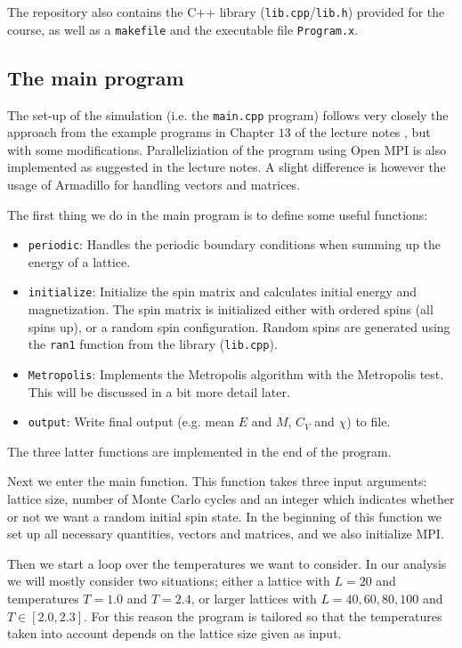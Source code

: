 \documentclass[12pt, a4paper]{article}
\begin{document}
The repository also contains the C++ library (\texttt{lib.cpp}/\texttt{lib.h}) provided for the course, 
as well as a \texttt{makefile} and the executable file \texttt{Program.x}. 

\subsection{The main program}

The set-up of the simulation (i.e. the \texttt{main.cpp} program) follows very closely the approach from 
the example programs in Chapter $13$ of the lecture notes \cite{Lecture Notes}, but with some 
modifications. Paralleliziation of the program using Open MPI is also implemented as suggested in 
the lecture notes. A slight difference is however the usage of Armadillo \cite{Armadillo} for handling 
vectors and matrices.   

The first thing we do in the main program is to define some useful functions:  
\begin{itemize}
\item \texttt{periodic}: Handles the periodic boundary conditions when summing up the energy of a lattice.
\item \texttt{initialize}: Initialize the spin matrix and calculates initial energy and magnetization. 
The spin matrix is initialized either with ordered spins (all spins up), or a random spin configuration. 
Random spins are generated using the \texttt{ran1} function from the library (\texttt{lib.cpp}).
\item \texttt{Metropolis}: Implements the Metropolis algorithm with the Metropolis test. This will be 
discussed in a bit more detail later. 
\item \texttt{output}: Write final output (e.g. mean $E$ and $M$, $C_V$ and $\chi$) to file. 
\end{itemize}
The three latter functions are implemented in the end of the program. 

Next we enter the main function. This function takes three input arguments: lattice size, number of 
Monte Carlo cycles and an integer which indicates whether or not we want a random initial spin state. 
In the beginning of this function we set up all necessary quantities, vectors and matrices, and we 
also initialize MPI. 

Then we start a loop over the temperatures we want to consider. In our analysis we will mostly 
consider two situations; either a lattice with $L=20$ and temperatures $T=1.0$ and $T=2.4$, or 
larger lattices with $L=40,60,80,100$ and $T \in \left[2.0,2.3\right]$. For this reason the program 
is tailored so that the temperatures taken into account depends on the lattice size given as input. 
\end{document}
